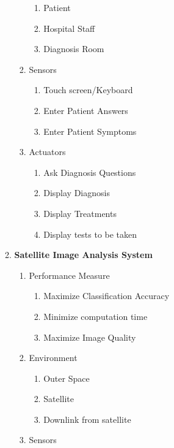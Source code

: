 \documentclass[12pt,letterpaper]{article}
\begin{document}
\begin{enumerate}
\begin{enumerate}
\begin{enumerate}
\begin{enumerate}
                \item Patient
                \item Hospital Staff
                \item Diagnosis Room
                \end{enumerate}
            \item Sensors
                \begin{enumerate}
                \item Touch screen/Keyboard
                \item Enter Patient Answers
                \item Enter Patient Symptoms
                \end{enumerate}
            \item Actuators
                \begin{enumerate}
                \item Ask Diagnosis Questions
                \item Display Diagnosis
                \item Display Treatments
                \item Display tests to be taken
                \end{enumerate}
            \end{enumerate}
        \item \textbf{Satellite Image Analysis System}
            \begin{enumerate}
            \item Performance Measure
                \begin{enumerate}
                \item Maximize Classification Accuracy
                \item Minimize computation time
                \item Maximize Image Quality
                \end{enumerate}
            \item Environment
                \begin{enumerate}
                \item Outer Space
                \item Satellite
                \item Downlink from satellite
                \end{enumerate}
            \item Sensors
                \begin{enumerate}

\end{enumerate}
\end{enumerate}
\end{enumerate}
\end{enumerate}
\end{document}
